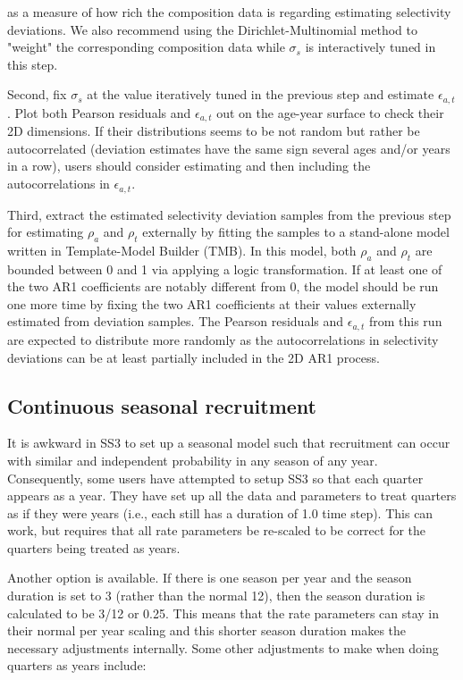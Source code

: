 as a measure of how rich the composition data is regarding estimating selectivity deviations. We also recommend using the Dirichlet-Multinomial method to "weight" the corresponding composition data while $\sigma_s$ is interactively tuned in this step.

Second, fix $\sigma_s$ at the value iteratively tuned in the previous step and estimate $\epsilon_{a,t}$. Plot both Pearson residuals and $\epsilon_{a,t}$ out on the age-year surface to check their 2D dimensions. If their distributions seems to be not random but rather be autocorrelated (deviation estimates have the same sign several ages and/or years in a row), users should consider estimating and then including the autocorrelations in $\epsilon_{a,t}$.

Third, extract the estimated selectivity deviation samples from the previous step for estimating $\rho_a$ and $\rho_t$ externally by fitting the samples to a stand-alone model written in Template-Model Builder (TMB). In this model, both $\rho_a$ and $\rho_t$ are bounded between 0 and 1 via applying a logic transformation. If at least one of the two AR1 coefficients are notably different from 0, the model should be run one more time by fixing the two AR1 coefficients at their values externally estimated from deviation samples. The Pearson residuals and $\epsilon_{a,t}$ from this run are expected to distribute more randomly as the  autocorrelations in selectivity deviations can be at least partially included in the 2D AR1 process.


\subsection{Continuous seasonal recruitment}
It is awkward in SS3 to set up a seasonal model such that recruitment can occur with similar and independent probability in any season of any year.  Consequently, some users have attempted to setup SS3 so that each quarter appears as a year.  They have set up all the data and parameters to treat quarters as if they were years (i.e., each still has a duration of 1.0 time step).  This can work, but requires that all rate parameters be re-scaled to be correct for the quarters being treated as years.

Another option is available.  If there is one season per year and the season duration is set to 3 (rather than the normal 12), then the season duration is calculated to be 3/12 or 0.25. This means that the rate parameters can stay in their normal per year scaling and this shorter season duration makes the necessary adjustments internally. Some other adjustments to make when doing quarters as years include:

